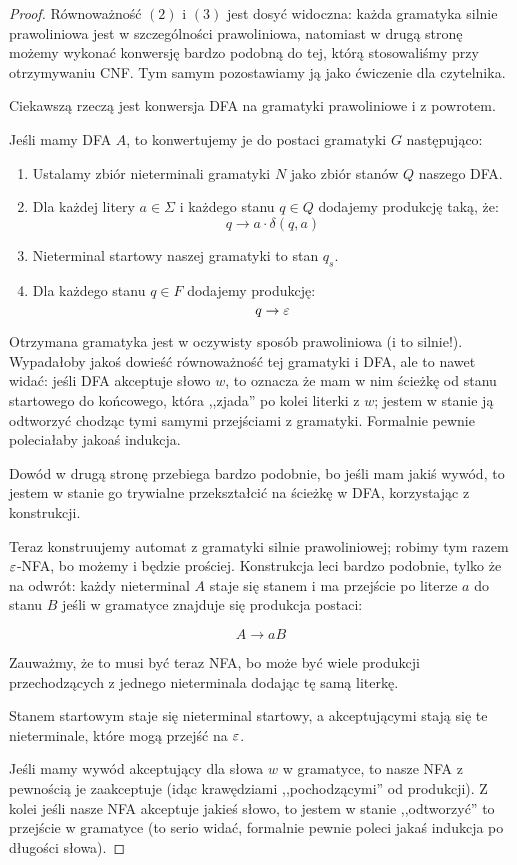 \begin{proof}
	Równoważność \((2)\) i \((3)\) jest dosyć widoczna: każda gramatyka silnie prawoliniowa jest w szczególności prawoliniowa, natomiast w drugą stronę możemy wykonać konwersję bardzo podobną do tej, którą stosowaliśmy przy otrzymywaniu CNF. Tym samym pozostawiamy ją jako ćwiczenie dla czytelnika.

	Ciekawszą rzeczą jest konwersja DFA na gramatyki prawoliniowe i z powrotem.

	Jeśli mamy DFA \(A\), to konwertujemy je do postaci gramatyki \(G\) następująco:

	\begin{enumerate}
		\item Ustalamy zbiór nieterminali gramatyki \(N\) jako zbiór stanów \(Q\) naszego DFA.
		\item Dla każdej litery \(a \in \Sigma\) i każdego stanu \(q\in Q\) dodajemy produkcję taką, że:
		      \[
			      q \rightarrow a \cdot \delta(q,a)
		      \]
		\item Nieterminal startowy naszej gramatyki to stan \(q_s\).
		\item Dla każdego stanu \(q \in F\) dodajemy produkcję:
		      \[
			      q \rightarrow \varepsilon
		      \]
	\end{enumerate}

	Otrzymana gramatyka jest w oczywisty sposób prawoliniowa (i to silnie!). Wypadałoby jakoś dowieść równoważność tej gramatyki i DFA, ale to nawet widać: jeśli DFA akceptuje słowo \(w\), to oznacza że mam w nim ścieżkę od stanu startowego do końcowego, która ,,zjada'' po kolei literki z \(w\); jestem w stanie ją odtworzyć chodząc tymi samymi przejściami z gramatyki. Formalnie pewnie poleciałaby jakoaś indukcja.

	Dowód w drugą stronę przebiega bardzo podobnie, bo jeśli mam jakiś wywód, to jestem w stanie go trywialne przekształcić na ścieżkę w DFA, korzystając z konstrukcji.

	Teraz konstruujemy automat z gramatyki silnie prawoliniowej; robimy tym razem \(\varepsilon\)-NFA, bo możemy i będzie prościej. Konstrukcja leci bardzo podobnie, tylko że na odwrót: każdy nieterminal \(A\) staje się stanem i ma przejście po literze \(a\) do stanu \(B\) jeśli w gramatyce znajduje się produkcja postaci:

	\[
		A \rightarrow aB
	\]

	Zauważmy, że to musi być teraz NFA, bo może być wiele produkcji przechodzących z jednego nieterminala dodając tę samą literkę.

	Stanem startowym staje się nieterminal startowy, a akceptującymi stają się te nieterminale, które mogą przejść na \(\varepsilon\).

	Jeśli mamy wywód akceptujący dla słowa \(w\) w gramatyce, to nasze NFA z pewnością je zaakceptuje (idąc krawędziami ,,pochodzącymi'' od produkcji). Z kolei jeśli nasze NFA akceptuje jakieś słowo, to jestem w stanie ,,odtworzyć'' to przejście w gramatyce (to serio widać, formalnie pewnie poleci jakaś indukcja po długości słowa).

\end{proof}